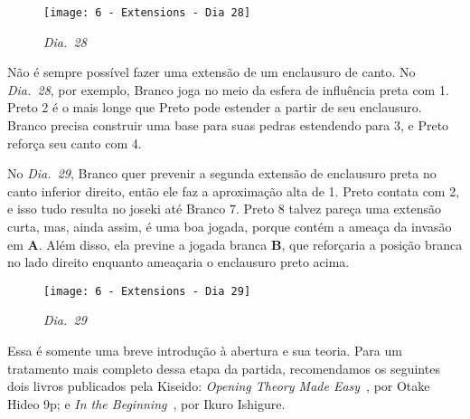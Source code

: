 \pagebreak

\begin{wrapfigure}{r}{60mm}
    \vspace{-15pt}
    \begin{center}
        \texttt{[image: 6 - Extensions - Dia 28]}
        \captionsetup{justification=centering}
        \caption*{\emph{Dia.\@~28}}
    \end{center}
    \vspace{-10pt}
\end{wrapfigure}

Não é sempre possível fazer uma extensão de um enclausuro de canto. No \emph{Dia.\@~28}, por exemplo, Branco joga no meio da esfera de influência preta com 1. Preto 2 é o mais longe que Preto pode estender a partir de seu enclausuro. Branco precisa construir uma base para suas pedras estendendo para 3, e Preto reforça seu canto com 4.

No \emph{Dia.\@~29}, Branco quer prevenir a segunda extensão de enclausuro preta no canto inferior direito, então ele faz a aproximação alta de 1. Preto contata com 2, e isso tudo resulta no joseki até Branco 7. Preto 8 talvez pareça uma extensão curta, mas, ainda assim, é uma boa jogada, porque contém a ameaça da invasão em \textbf{A}. Além disso, ela previne a jogada branca \textbf{B}, que reforçaria a posição branca no lado direito enquanto ameaçaria o enclausuro preto acima.

\bigskip

\begin{wrapfigure}{l}{60mm}
    \vspace{-27.5pt}
    \begin{center}
        \texttt{[image: 6 - Extensions - Dia 29]}
        \captionsetup{justification=centering}
        \caption*{\emph{Dia.\@~29}}
    \end{center}
    \vspace{-10pt}
\end{wrapfigure}

Essa é somente uma breve introdução à abertura e sua teoria. Para um tratamento mais completo dessa etapa da partida, recomendamos os seguintes dois livros publicados pela Kiseido: \emph{Opening Theory Made Easy}~\cite{otake_opening_theory_made_easy}, por Otake Hideo 9p; e \emph{In the Beginning}~\cite{ikure_in_the_beginning}, por Ikuro Ishigure.